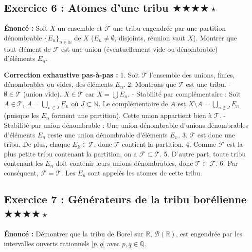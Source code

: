 \documentclass[11pt,a4paper]{article}
\begin{document}
\subsection*{Exercice 6 : Atomes d'une tribu \quad $\bigstar\bigstar\bigstar\bigstar\star$}


\textbf{Énoncé :}
Soit $X$ un ensemble et $\mathcal{F}$ une tribu engendrée par une partition dénombrable $\{E_n\}_{n \in \mathbb{N}}$ de $X$ ($E_n \neq \emptyset$, disjoints, réunion vaut $X$). Montrer que tout élément de $\mathcal{F}$ est une union (éventuellement vide ou dénombrable) d'éléments $E_n$.

\textbf{Correction exhaustive pas-à-pas :}
1. Soit $\mathcal{T}$ l'ensemble des unions, finies, dénombrables ou vides, des éléments $E_n$.
2. Montrons que $\mathcal{T}$ est une tribu.
   - $\emptyset \in \mathcal{T}$ (union vide). $X \in \mathcal{T}$ car $X = \bigcup E_n$.
   - Stabilité par complémentaire : Soit $A \in \mathcal{T}$, $A = \bigcup_{n \in J} E_n$ où $J \subset \mathbb{N}$. Le complémentaire de $A$ est $X \setminus A = \bigcup_{n \notin J} E_n$ (puisque les $E_n$ forment une partition). Cette union appartient bien à $\mathcal{T}$.
   - Stabilité par union dénombrable : Une union dénombrable d'unions dénombrables d'éléments $E_n$ reste une union dénombrable d'éléments $E_n$.
3. $\mathcal{T}$ est donc une tribu. De plus, chaque $E_k \in \mathcal{T}$, donc $\mathcal{T}$ contient la partition.
4. Comme $\mathcal{F}$ est la plus petite tribu contenant la partition, on a $\mathcal{F} \subset \mathcal{T}$.
5. D'autre part, toute tribu contenant les $E_n$ doit contenir leurs unions dénombrables, donc $\mathcal{T} \subset \mathcal{F}$.
6. Par conséquent, $\mathcal{F} = \mathcal{T}$. Les $E_n$ sont appelés les atomes de cette tribu.



\subsection*{Exercice 7 : Générateurs de la tribu borélienne \quad $\bigstar\bigstar\bigstar\bigstar\star$}


\textbf{Énoncé :}
Démontrer que la tribu de Borel sur $\mathbb{R}$, $\mathcal{B}(\mathbb{R})$, est engendrée par les intervalles ouverts rationnels $]p, q[$ avec $p, q \in \mathbb{Q}$.
\end{document}
